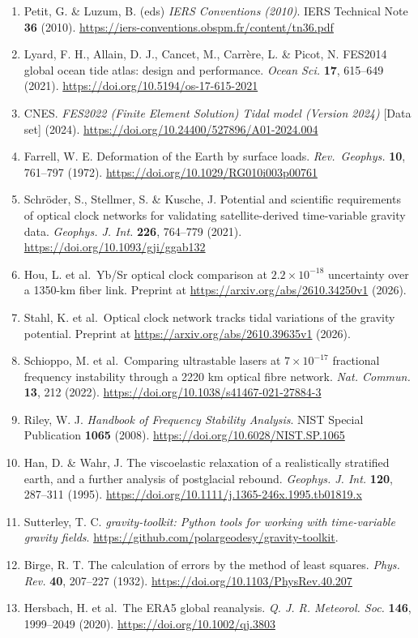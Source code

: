 \documentclass[
  11pt,
  a4paper,
]{article}
\begin{document}
\begin{enumerate}
\item
  Petit, G. \& Luzum, B. (eds) \emph{IERS Conventions (2010)}. IERS
  Technical Note \textbf{36} (2010).
  \url{https://iers-conventions.obspm.fr/content/tn36.pdf}
\item
  Lyard, F. H., Allain, D. J., Cancet, M., Carrère, L. \& Picot, N.
  FES2014 global ocean tide atlas: design and performance. \emph{Ocean
  Sci.} \textbf{17}, 615--649 (2021).
  \url{https://doi.org/10.5194/os-17-615-2021}
\item
  CNES. \emph{FES2022 (Finite Element Solution) Tidal model (Version
  2024)} {[}Data set{]} (2024).
  \url{https://doi.org/10.24400/527896/A01-2024.004}
\item
  Farrell, W. E. Deformation of the Earth by surface loads.
  \emph{Rev.~Geophys.} \textbf{10}, 761--797 (1972).
  \url{https://doi.org/10.1029/RG010i003p00761}
\item
  Schröder, S., Stellmer, S. \& Kusche, J. Potential and scientific
  requirements of optical clock networks for validating
  satellite-derived time-variable gravity data. \emph{Geophys. J. Int.}
  \textbf{226}, 764--779 (2021).
  \url{https://doi.org/10.1093/gji/ggab132}
\item
  Hou, L. et al.~Yb/Sr optical clock comparison at \(2.2\times10^{-18}\)
  uncertainty over a 1350-km fiber link. Preprint at
  \url{https://arxiv.org/abs/2610.34250v1} (2026).
\item
  Stahl, K. et al.~Optical clock network tracks tidal variations of the
  gravity potential. Preprint at
  \url{https://arxiv.org/abs/2610.39635v1} (2026).
\item
  Schioppo, M. et al.~Comparing ultrastable lasers at
  \(7\times10^{-17}\) fractional frequency instability through a 2220 km
  optical fibre network. \emph{Nat. Commun.} \textbf{13}, 212 (2022).
  \url{https://doi.org/10.1038/s41467-021-27884-3}
\item
  Riley, W. J. \emph{Handbook of Frequency Stability Analysis}. NIST
  Special Publication \textbf{1065} (2008).
  \url{https://doi.org/10.6028/NIST.SP.1065}
\item
  Han, D. \& Wahr, J. The viscoelastic relaxation of a realistically
  stratified earth, and a further analysis of postglacial rebound.
  \emph{Geophys. J. Int.} \textbf{120}, 287--311 (1995).
  \url{https://doi.org/10.1111/j.1365-246x.1995.tb01819.x}
\item
  Sutterley, T. C. \emph{gravity-toolkit: Python tools for working with
  time-variable gravity fields}.
  \url{https://github.com/polargeodesy/gravity-toolkit}.
\item
  Birge, R. T. The calculation of errors by the method of least squares.
  \emph{Phys. Rev.} \textbf{40}, 207--227 (1932).
  \url{https://doi.org/10.1103/PhysRev.40.207}
\item
  Hersbach, H. et al.~The ERA5 global reanalysis. \emph{Q. J. R.
  Meteorol. Soc.} \textbf{146}, 1999--2049 (2020).
  \url{https://doi.org/10.1002/qj.3803}
\end{enumerate}
\end{document}
